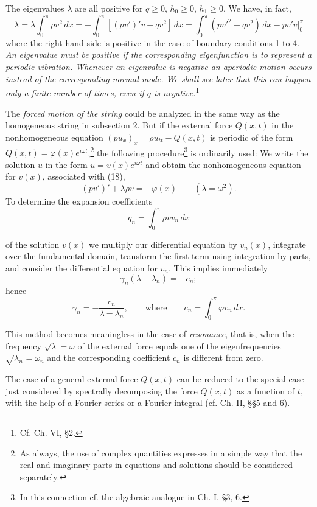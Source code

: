 The eigenvalues $\lambda$ are all positive for $q\ge0$, $h_0\ge0$, $h_1\ge0$. We have, in fact,
\[
\lambda=\lambda\int_0^\pi\rho v^2\,dx
=-\int_0^\pi[(pv')'v-qv^2] \, dx
=\int_0^\pi(pv'^2+qv^2)\,dx-\left.pv'v\right|_0^\pi
\]
where the right-hand side is positive in the case of boundary conditions 1 to 4. \emph{An eigenvalue must be positive if the corresponding eigenfunction is to represent a periodic vibration. Whenever an eigenvalue is negative an aperiodic motion occurs instead of the corresponding normal mode. We shall see later that this can happen only a finite number of times, even if $q$ is negative.}\footnote{Cf. Ch. VI, \S2.}

The \emph{forced motion of the string} could be analyzed in the same way as the homogeneous string in subsection 2. But if the external force $Q(x,t)$ in the nonhomogeneous equation $(pu_x)_x=\rho u_{tt}-Q(x,t)$ is periodic of the form $Q(x,t)=\varphi(x)e^{i\omega t}$,\footnote{As always, the use of complex quantities expresses in a simple way that the real and imaginary parts in equations and solutions should be considered separately.} the following procedure\footnote{In this connection cf. the algebraic analogue in Ch. I, \S3, 6.} is ordinarily used: We write the solution $u$ in the form $u=v(x)e^{i\omega t}$ and obtain the nonhomogeneous equation for $v(x)$, associated with (18),
\[
(pv')'+\lambda\rho v=-\varphi(x)\qquad(\lambda=\omega^2).
\]
To determine the expansion coefficients
\[
q_n=\int_0^\pi\rho vv_n\,dx
\]

of the solution $v(x)$ we multiply our differential equation by $v_n(x)$, integrate over the fundamental domain, transform the first term using integration by parts, and consider the differential equation for $v_n$. This implies immediately
\[
\gamma_n(\lambda-\lambda_n)=-c_n;
\]
hence
\[
\gamma_n=-\frac{c_n}{\lambda-\lambda_n},
\qquad\text{where}\qquad
c_n=\int_0^\pi \varphi v_n\,dx.
\]

This method becomes meaningless in the case of \emph{resonance}, that is, when the frequency $\sqrt\lambda=\omega$ of the external force equals one of the eigenfrequencies $\sqrt{\lambda_n}=\omega_n$ and the corresponding coefficient $c_n$ is different from zero.

The case of a general external force $Q(x,t)$ can be reduced to the special case just considered by spectrally decomposing the force $Q(x,t)$ as a function of $t$, with the help of a Fourier series or a Fourier integral (cf. Ch. II, \S\S5 and 6).

